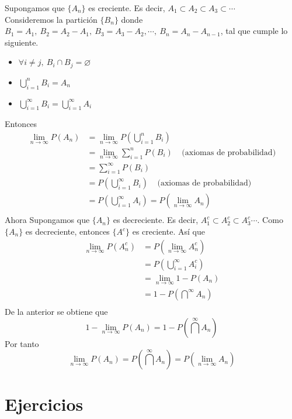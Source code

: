 \begin{myproof}
  Supongamos que $\{A_n\}$ es creciente. Es decir, $A_1 \subset A_2 \subset A_3 \subset \cdots$\\
  Consideremos la partición $\{B_n\}$ donde $B_1 = A_1,~ B_2 = A_2 - A_1, ~ B_3 = A_3 - A_2, \cdots,~ B_n = A_n - A_{n-1}$, tal que cumple lo siguiente.
  \begin{itemize}
    \item $\forall i \neq j,~ B_i \cap B_j = \varnothing$
    \item $\bigcup_{i = 1}^n B_i = A_n$
    \item $\bigcup_{i = 1}^{\infty} B_i = \bigcup_{i = 1}^{\infty} A_i$
  \end{itemize}
  Entonces
  \begin{align*}
    \lim_{n \to \infty} P(A_n) &= \lim_{n \to \infty} P(\bigcup_{i = 1}^n B_i)\\
                               &= \lim_{n \to \infty} \sum_{i = 1}^n P(B_i) ~~~~~ \text{(axiomas de probabilidad)} \\
                               &= \sum_{i = 1}^{\infty} P(B_i)\\ 
                               &= P(\bigcup_{i = 1}^{\infty}B_i) ~~~~~ \text{(axiomas de probabilidad)}\\ 
                               &= P(\bigcup_{i = 1}^{\infty}A_i) = P(\lim_{n \to \infty} A_n)\\
  \end{align*}
  Ahora Supongamos que $\{A_n\}$ es decreciente. Es decir, $A_1^c \subset A_2^c \subset A_3^c \cdots$. Como $\{A_n\}$ es decreciente, entonces $\{A^c\}$ es creciente. Así que
  \begin{align*}
    \lim_{n \to \infty} P(A_n^c) &= P(\lim_{n \to \infty}A_n^c) \\
                        &= P(\bigcup_{i = 1}^{\infty}A_i^c) \\
                        &= \lim_{n \to \infty} 1 - P(A_n) \\
                        &= 1 - P(\bigcap^{\infty}A_n)\\
  \end{align*}
  De la anterior se obtiene que 
  \[1 - \lim_{n \to \infty} P(A_n) = 1 - P(\bigcap^{\infty}A_n)\]
  Por tanto
  \[\lim_{n \to \infty}P(A_n) = P(\bigcap^{\infty}A_n) = P(\lim_{n \to \infty}A_n)\]
\end{myproof}

\newpage
\section{Ejercicios}

